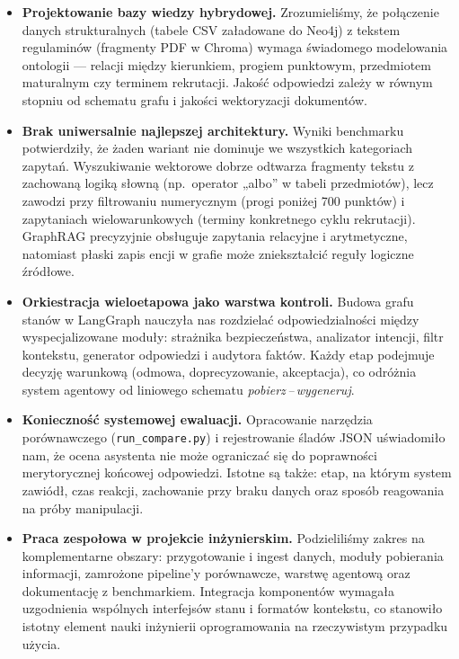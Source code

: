 \begin{tcolorbox}[colback=blue!5!white,colframe=blue!75!black,title=Doświadczenia edukacyjne zespołu]
    \begin{itemize}[leftmargin=*, nosep]
        \item \textbf{Projektowanie bazy wiedzy hybrydowej.}
              Zrozumieliśmy, że połączenie danych strukturalnych (tabele CSV załadowane do Neo4j)
              z tekstem regulaminów (fragmenty PDF w Chroma) wymaga świadomego modelowania ontologii ---
              relacji między kierunkiem, progiem punktowym, przedmiotem maturalnym czy terminem rekrutacji.
              Jakość odpowiedzi zależy w równym stopniu od schematu grafu i jakości wektoryzacji dokumentów.

        \item \textbf{Brak uniwersalnie najlepszej architektury.}
              Wyniki benchmarku potwierdziły, że żaden wariant nie dominuje we wszystkich kategoriach zapytań.
              Wyszukiwanie wektorowe dobrze odtwarza fragmenty tekstu z zachowaną logiką słowną
              (np.\ operator „albo'' w tabeli przedmiotów), lecz zawodzi przy filtrowaniu numerycznym
              (progi poniżej 700 punktów) i zapytaniach wielowarunkowych (terminy konkretnego cyklu rekrutacji).
              GraphRAG precyzyjnie obsługuje zapytania relacyjne i arytmetyczne, natomiast płaski zapis encji
              w grafie może zniekształcić reguły logiczne źródłowe.

        \item \textbf{Orkiestracja wieloetapowa jako warstwa kontroli.}
              Budowa grafu stanów w LangGraph nauczyła nas rozdzielać odpowiedzialności między wyspecjalizowane
              moduły: strażnika bezpieczeństwa, analizator intencji, filtr kontekstu, generator odpowiedzi
              i audytora faktów. Każdy etap podejmuje decyzję warunkową (odmowa, doprecyzowanie, akceptacja),
              co odróżnia system agentowy od liniowego schematu \textit{pobierz\,--\,wygeneruj}.

        \item \textbf{Konieczność systemowej ewaluacji.}
              Opracowanie narzędzia porównawczego (\texttt{run\_compare.py}) i rejestrowanie śladów JSON
              uświadomiło nam, że ocena asystenta nie może ograniczać się do poprawności merytorycznej końcowej odpowiedzi.
              Istotne są także: etap, na którym system zawiódł, czas reakcji, zachowanie przy braku danych
              oraz sposób reagowania na próby manipulacji.

        \item \textbf{Praca zespołowa w projekcie inżynierskim.}
              Podzieliliśmy zakres na komplementarne obszary: przygotowanie i ingest danych, moduły pobierania
              informacji, zamrożone pipeline'y porównawcze, warstwę agentową oraz dokumentację z benchmarkiem.
              Integracja komponentów wymagała uzgodnienia wspólnych interfejsów stanu i formatów kontekstu,
              co stanowiło istotny element nauki inżynierii oprogramowania na rzeczywistym przypadku użycia.
    \end{itemize}
\end{tcolorbox}

